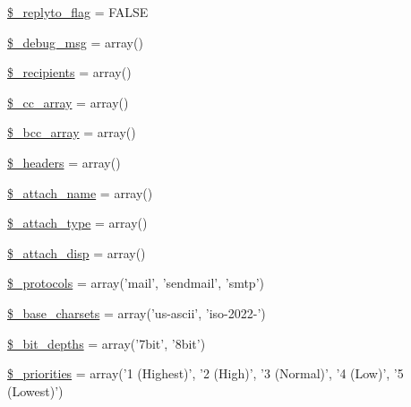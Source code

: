 \begin{DoxyCompactItemize}
\item 
\hyperlink{class_c_i___email_a00e8e2c2c72e6acf2cd91a8c4498695a}{\$\-\_\-replyto\-\_\-flag} = F\-A\-L\-S\-E
\item 
\hyperlink{class_c_i___email_a23c65b604c773811f76e75093fe9a77b}{\$\-\_\-debug\-\_\-msg} = array()
\item 
\hyperlink{class_c_i___email_aa5f5e78dd9477bdec18b4aadae77ba13}{\$\-\_\-recipients} = array()
\item 
\hyperlink{class_c_i___email_af979b4b8dc11cd847482938c13fd527d}{\$\-\_\-cc\-\_\-array} = array()
\item 
\hyperlink{class_c_i___email_a9e55a2ff848d216fa27361d3c66d979d}{\$\-\_\-bcc\-\_\-array} = array()
\item 
\hyperlink{class_c_i___email_a1481ae63a7fb295087c3a668a0359500}{\$\-\_\-headers} = array()
\item 
\hyperlink{class_c_i___email_a4ce64db2018a92c0ba67265315185f51}{\$\-\_\-attach\-\_\-name} = array()
\item 
\hyperlink{class_c_i___email_aab19518d4680c05dea288162e684f0cb}{\$\-\_\-attach\-\_\-type} = array()
\item 
\hyperlink{class_c_i___email_addbe468b29817a8cd1484d136b8b29e3}{\$\-\_\-attach\-\_\-disp} = array()
\item 
\hyperlink{class_c_i___email_a67dcd847790518bf5fbe6576a0c11c04}{\$\-\_\-protocols} = array('mail', 'sendmail', 'smtp')
\item 
\hyperlink{class_c_i___email_a212a02e70f089ba2e1a29bd6f45b0691}{\$\-\_\-base\-\_\-charsets} = array('us-\/ascii', 'iso-\/2022-\/')
\item 
\hyperlink{class_c_i___email_a65b779b2385490a293d286a135bdf00c}{\$\-\_\-bit\-\_\-depths} = array('7bit', '8bit')
\item 
\hyperlink{class_c_i___email_af2e56ba04b214aad41be6db88e729645}{\$\-\_\-priorities} = array('1 (Highest)', '2 (High)', '3 (Normal)', '4 (Low)', '5 (Lowest)')
\end{DoxyCompactItemize}
